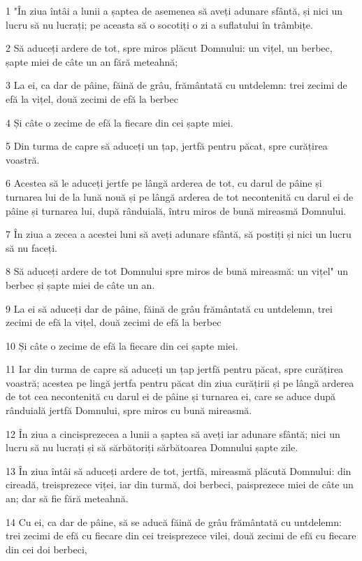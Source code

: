 \par 1 "În ziua întâi a lunii a șaptea de asemenea să aveți adunare sfântă, și nici un lucru să nu lucrați; pe aceasta să o socotiți o zi a suflatului în trâmbițe.
\par 2 Să aduceți ardere de tot, spre miros plăcut Domnului: un vițel, un berbec, șapte miei de câte un an fără meteahnă;
\par 3 La ei, ca dar de pâine, făină de grâu, frământată cu untdelemn: trei zecimi de efă la vițel, două zecimi de efă la berbec
\par 4 Și câte o zecime de efă la fiecare din cei șapte miei.
\par 5 Din turma de capre să aduceți un țap, jertfă pentru păcat, spre curățirea voastră.
\par 6 Acestea să le aduceți jertfe pe lângă arderea de tot, cu darul de pâine și turnarea lui de la lună nouă și pe lângă arderea de tot necontenită cu darul ei de pâine și turnarea lui, după rânduială, întru miros de bună mireasmă Domnului.
\par 7 În ziua a zecea a acestei luni să aveți adunare sfântă, să postiți și nici un lucru să nu faceți.
\par 8 Să aduceți ardere de tot Domnului spre miros de bună mireasmă: un vițel" un berbec și șapte miei de câte un an.
\par 9 La ei să aduceți dar de pâine, făină de grâu frământată cu untdelemn, trei zecimi de efă la vițel, două zecimi de efă la berbec
\par 10 Și câte o zecime de efă la fiecare din cei șapte miei.
\par 11 Iar din turma de capre să aduceți un țap jertfă pentru păcat, spre curățirea voastră; acestea pe lingă jertfa pentru păcat din ziua curățirii și pe lângă arderea de tot cea necontenită cu darul ei de pâine și turnarea ei, care se aduce după rânduială jertfă Domnului, spre miros cu bună mireasmă.
\par 12 În ziua a cincisprezecea a lunii a șaptea să aveți iar adunare sfântă; nici un lucru să nu lucrați și să sărbătoriți sărbătoarea Domnului șapte zile.
\par 13 În ziua întâi să aduceți ardere de tot, jertfă, mireasmă plăcută Domnului: din cireadă, treisprezece viței, iar din turmă, doi berbeci, paisprezece miei de câte un an; dar să fie fără meteahnă.
\par 14 Cu ei, ca dar de pâine, să se aducă făină de grâu frământată cu untdelemn: trei zecimi de efă cu fiecare din cei treisprezece vilei, două zecimi de efă cu fiecare din cei doi berbeci,
